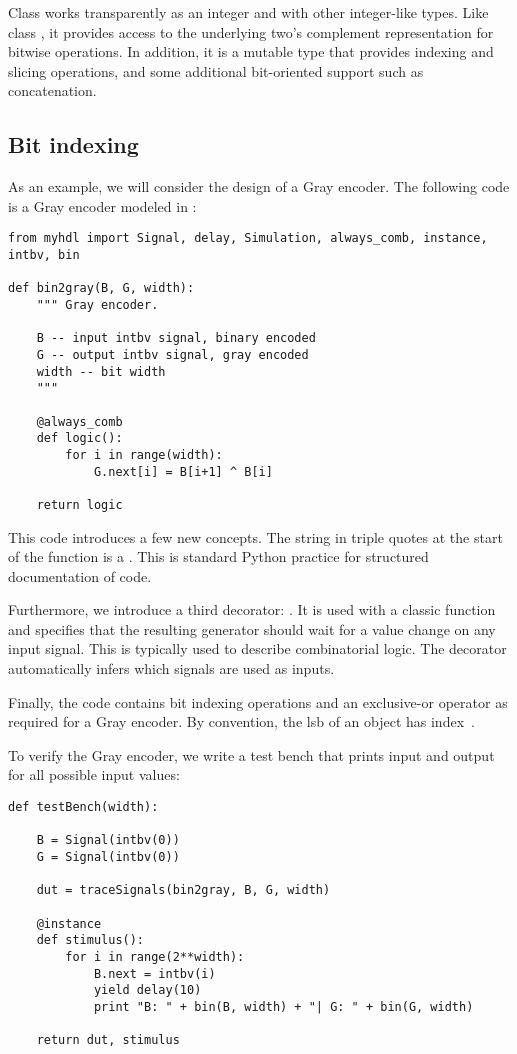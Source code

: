 Class  works transparently as an integer and with other
integer-like types. Like class , it provides access to the
underlying two's complement representation for bitwise
operations. In addition, it is a mutable type that provides indexing
and slicing operations, and some additional bit-oriented support such
as concatenation.

\subsection{Bit indexing \label{intro-indexing}}

As an example, we will consider the design of a Gray encoder. The
following code is a Gray encoder modeled in \myhdl{}:

\begin{verbatim}
from myhdl import Signal, delay, Simulation, always_comb, instance, intbv, bin

def bin2gray(B, G, width):
    """ Gray encoder.

    B -- input intbv signal, binary encoded
    G -- output intbv signal, gray encoded
    width -- bit width
    """
    
    @always_comb
    def logic():
        for i in range(width):
            G.next[i] = B[i+1] ^ B[i]
            
    return logic
\end{verbatim}

This code introduces a few new concepts. The string in triple quotes
at the start of the function is a . This is standard
Python practice for structured documentation of code.

Furthermore, we introduce a third decorator: .
It is used with a classic function and specifies that the 
resulting generator should
wait for a value change on any input signal. This is typically used to
describe 
combinatorial logic. The  decorator
automatically infers which signals are used as inputs.

Finally, the code contains bit indexing operations and an exclusive-or
operator as required for a Gray encoder. By convention, the lsb of an
 object has index~.

To verify the Gray encoder, we write a test bench that prints input
and output for all possible input values:

\begin{verbatim}
def testBench(width):
    
    B = Signal(intbv(0))
    G = Signal(intbv(0))
    
    dut = traceSignals(bin2gray, B, G, width)

    @instance
    def stimulus():
        for i in range(2**width):
            B.next = intbv(i)
            yield delay(10)
            print "B: " + bin(B, width) + "| G: " + bin(G, width)

    return dut, stimulus
\end{verbatim}

